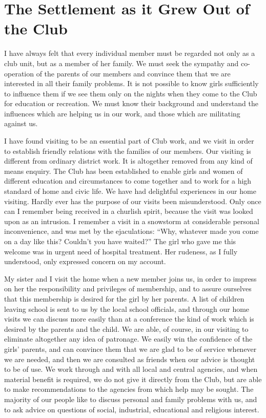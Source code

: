 \chapter{The Settlement as it Grew Out of the Club}

I have always felt that every individual member must be
regarded not only as a club unit, but as a member of her
family. We must seek the sympathy and co-operation of
the parents of our members and convince them that we
are interested in all their family problems. It is not possible
to know girls sufficiently to influence them if we
see them only on the nights when they come to the Club
for education or recreation. We must know their background
and understand the influences which are helping
us in our work, and those which are militating against
us.

I have found visiting to be an essential part of Club
work, and we visit in order to establish friendly
relations with the families of our members. Our
visiting is different from ordinary district work. It is
altogether removed from any kind of means enquiry. The
Club has been established to enable girls and women of
different education and circumstances to come together
and to work for a high standard of home and civic life.
We have had delightful experiences in our home visiting.
Hardly ever has the purpose of our visits been misunderstood.
Only once can I remember being received in a
churlish spirit, because the visit was looked upon as an
intrusion. I remember a visit in a snowstorm at considerable
personal inconvenience, and was met by the
ejaculations: “Why, whatever made you come on a day
like this? Couldn’t you have waited?” The girl who gave
me this welcome was in urgent need of hospital treatment.
Her rudeness, as I fully understood, only expressed
concern on my account.

My sister and I visit the home when a new member
joins us, in order to impress on her the responsibility and
privileges of membership, and to assure ourselves that this
membership is desired for the girl by her parents. A list
of children leaving school is sent to us by the local school
officials, and through our home visits we can discuss more
easily than at a conference the kind of work which is
desired by the parents and the child. We are able, of
course, in our visiting to eliminate altogether any idea of
patronage. We easily win the confidence of the girls’
parents, and can convince them that we are glad to be
of service whenever we are needed, and then we are consulted
as friends when our advice is thought to be of use.
We work through and with all local and central agencies,
and when material benefit is required, we do not give it
directly from the Club, but are able to make recommendations
to the agencies from which help may be
sought. The majority of our people like to discuss personal
and family problems with us, and to ask advice on
questions of social, industrial, educational and religious
interest.

